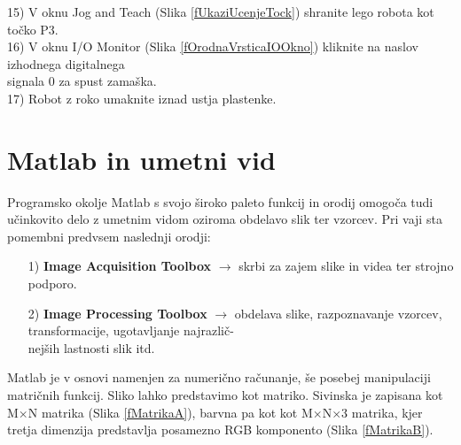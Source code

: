 \begin{mdframed}[backgroundcolor=blue!20, shadow=true,roundcorner=8pt]
15) V oknu Jog and Teach (Slika \ref{fUkaziUcenjeTock}) shranite lego robota kot točko P3. \vspace*{0.3cm} \\ %
16) V oknu I/O Monitor (Slika \ref{fOrodnaVrsticaIOOkno}) kliknite na naslov izhodnega digitalnega \\ %
\hspace*{0.55cm} signala 0 za spust zamaška. \vspace*{0.3cm} \\ %
17) Robot z roko umaknite iznad ustja plastenke. %
\end{mdframed}



\newpage
\section{Matlab in umetni vid}
\vspace{0.3cm}

Programsko okolje Matlab s svojo široko paleto funkcij in orodij
omogoča tudi učinkovito delo z umetnim vidom oziroma obdelavo slik
ter vzorcev. Pri vaji sta pomembni predvsem naslednji orodji:
\vspace*{0.2cm} %
\begin{enumerate}
\item[1)] \textbf{Image Acquisition Toolbox} $\longrightarrow$ skrbi za zajem slike in videa ter strojno \\%
\hspace*{5.1cm} podporo. \\ %
\vspace*{-0.37cm} %
\item[2)] \textbf{Image Processing Toolbox}  $\longrightarrow$ obdelava slike, razpoznavanje vzorcev,\\%
\hspace*{5.0cm} transformacije, ugotavljanje najrazlič-\\%
\hspace*{5.0cm} nejših lastnosti slik itd. \\ %
\end{enumerate}

Matlab je v osnovi namenjen za numerično računanje, še posebej
manipulaciji matričnih funkcij. Sliko lahko predstavimo kot
matriko. Sivinska je zapisana kot M$\times$N matrika (Slika
\ref{fMatrikaA}), barvna pa kot kot M$\times$N$\times$3 matrika,
kjer tretja dimenzija predstavlja posamezno RGB komponento (Slika
\ref{fMatrikaB}).

